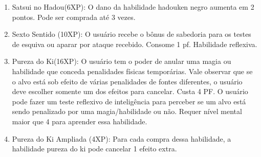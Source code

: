 \begin{enumerate}
	\item Satsui no Hadou(6XP):	O dano da habilidade hadouken negro aumenta em 2 pontos. Pode ser comprada até 3 vezes.

	\item Sexto Sentido (10XP): O usuário recebe o bônus de sabedoria para os testes de esquiva ou aparar por ataque recebido. Consome 1 pf. Habilidade reflexiva.



\item Pureza do Ki(16XP): O usuário tem o poder de anular uma magia ou habilidade que conceda penalidades físicas temporárias. Vale observar que se o alvo está sob efeito de várias penalidades de fontes diferentes, o usuário deve escolher somente um dos efeitos para cancelar. Custa 4 PF. O usuário pode fazer um teste reflexivo de inteligência para perceber se um alvo está sendo penalizado por uma magia/habilidade ou não. Requer nível mental maior que 4 para aprender essa habilidade.

	
\item Pureza do Ki Ampliada (4XP): Para cada compra dessa habilidade, a habilidade pureza do ki pode cancelar 1 efeito extra.
	

\end{enumerate}
